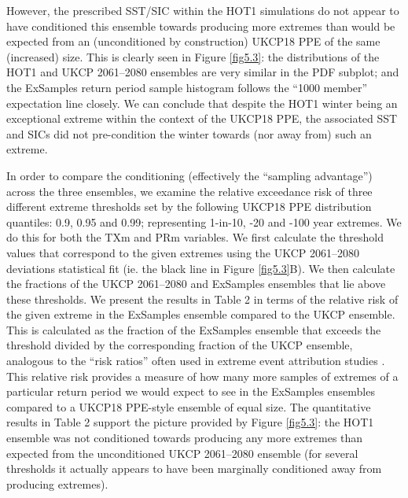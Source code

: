       However, the prescribed SST/SIC within the HOT1 simulations do not appear to have conditioned this ensemble towards producing more extremes than would be expected from an (unconditioned by construction) UKCP18 PPE of the same (increased) size. This is clearly seen in Figure \ref{fig5.3}: the distributions of the HOT1 and UKCP 2061--2080 ensembles are very similar in the PDF subplot; and the ExSamples return period sample histogram follows the ``1000 member'' expectation line closely. We can conclude that despite the HOT1 winter being an exceptional extreme within the context of the UKCP18 PPE, the associated SST and SICs did not pre-condition the winter towards (nor away from) such an extreme.
      
      In order to compare the conditioning (effectively the ``sampling advantage'') across the three ensembles, we examine the relative exceedance risk of three different extreme thresholds set by the following UKCP18 PPE distribution quantiles: 0.9, 0.95 and 0.99; representing 1-in-10, -20 and -100 year extremes. We do this for both the TXm and PRm variables. We first calculate the threshold values that correspond to the given extremes using the UKCP 2061--2080 deviations statistical fit (ie. the black line in Figure \ref{fig5.3}B). We then calculate the fractions of the UKCP 2061--2080 and ExSamples ensembles that lie above these thresholds. We present the results in Table 2 in terms of the relative risk of the given extreme in the ExSamples ensemble compared to the UKCP ensemble. This is calculated as the fraction of the ExSamples ensemble that exceeds the threshold divided by the corresponding fraction of the UKCP ensemble, analogous to the ``risk ratios'' often used in extreme event attribution studies \citep{stone_end--end_2005,stott_human_2004}. This relative risk provides a measure of how many more samples of extremes of a particular return period we would expect to see in the ExSamples ensembles compared to a UKCP18 PPE-style ensemble of equal size. The quantitative results in Table 2 support the picture provided by Figure \ref{fig5.3}: the HOT1 ensemble was not conditioned towards producing any more extremes than expected from the unconditioned UKCP 2061--2080 ensemble (for several thresholds it actually appears to have been marginally conditioned away from producing extremes).
      
